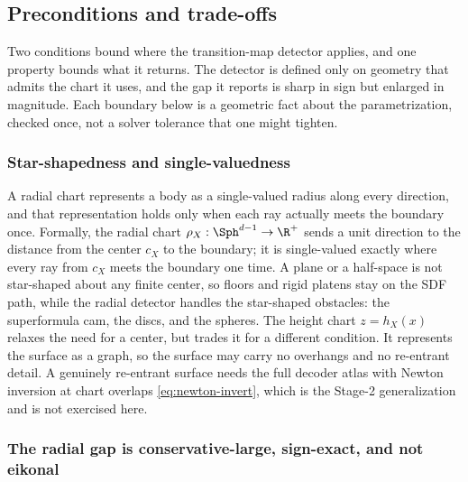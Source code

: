 \subsection{Preconditions and trade-offs}\label{sec:disc:precond}

Two conditions bound where the transition-map detector applies, and one property bounds what it returns.
The detector is defined only on geometry that admits the chart it uses, and the gap it reports is sharp
in sign but enlarged in magnitude. Each boundary below is a geometric fact about the parametrization,
checked once, not a solver tolerance that one might tighten.

\subsubsection{Star-shapedness and single-valuedness}

A radial chart represents a body as a single-valued radius along every direction, and that
representation holds only when each ray actually meets the boundary once. Formally, the radial chart
$\rho_X:\Sph^{d-1}\to\R^{+}$ sends a unit direction to the distance from the center $c_X$ to the
boundary; it is single-valued exactly where every ray from $c_X$ meets the boundary one time. A plane or
a half-space is not star-shaped about any finite center, so floors and rigid platens stay on the SDF
path, while the radial detector handles the star-shaped obstacles: the superformula cam, the discs, and
the spheres. The height chart $z=h_X(x)$ relaxes the need for a center, but trades it for a different
condition. It represents the surface as a graph, so the surface may carry no overhangs and no re-entrant
detail. A genuinely re-entrant surface needs the full decoder atlas with Newton inversion at chart
overlaps \eqref{eq:newton-invert}, which is the Stage-2 generalization and is not exercised here.

\subsubsection{The radial gap is conservative-large, sign-exact, and not eikonal}

